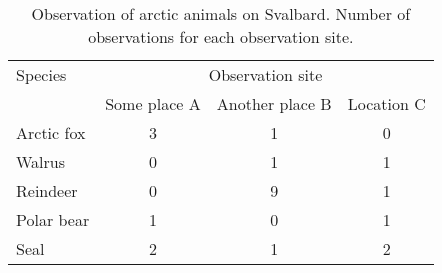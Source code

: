 \documentclass{article}
\begin{document}
  \begin{table}
    \caption{Observation of arctic animals on Svalbard. Number of observations for each observation site.}
    \vspace*{5mm}
    \begin{tabular}{lccc}
      \toprule
      Species    & \multicolumn{3}{c}{Observation site} \\
      \cmidrule{2-4}
                 & Some place A & Another place B & Location C \\
      \midrule
      Arctic fox &  3 &  1 &  0 \\
      Walrus     &  0 &  1 &  1 \\
      Reindeer   &  0 &  9 &  1 \\
      Polar bear &  1 &  0 &  1 \\
      Seal       &  2 &  1 &  2 \\
      \bottomrule
    \end{tabular}
  \end{table}
\end{document}
